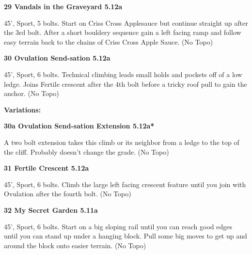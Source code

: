 \begin{multicols}{2}
\needspace{1.5cm}
\label{rt:Vandals in the Graveyard}
\colorbox{Goldenrod!20}{
\parbox{0.95\linewidth}{
\textbf{
29 Vandals in the Graveyard 5.12a  
}}}
\begin{adjustwidth}{0.5cm}{}			
45', Sport, 5 bolts. Start on Criss Cross Applesauce but continue straight up after the 3rd bolt. After a short bouldery sequence gain a left facing ramp and follow easy terrain back to the chains of Criss Cross Apple Sauce.
  (No Topo)
\end{adjustwidth}




\needspace{1.5cm}
\label{rt:Ovulation Send-sation}
\colorbox{Goldenrod!20}{
\parbox{0.95\linewidth}{
\textbf{
30 Ovulation Send-sation 5.12a  
}}}
\begin{adjustwidth}{0.5cm}{}			
45', Sport, 6 bolts. Technical climbing leads small holds and pockets off of a low ledge. Joins Fertile crescent after the 4th bolt before a tricky roof pull to gain the anchor.
  (No Topo)
\end{adjustwidth}


\begin{adjustwidth}{0.5cm}{}				
\needspace{3cm}
\textbf{Variations:} \newline

\needspace{1.5cm}
\label{vr:Ovulation Send-sation Extension}
\colorbox{Goldenrod!20}{
\parbox{0.95\linewidth}{
\textbf{
30a Ovulation Send-sation Extension 5.12a*  
}}}
\begin{adjustwidth}{0.5cm}{}			
A two bolt extension takes this climb or its neighbor from a ledge to the top of the cliff. Probably doesn't change the grade.
  (No Topo)
\end{adjustwidth}



\end{adjustwidth}


\needspace{1.5cm}
\label{rt:Fertile Crescent}
\colorbox{Goldenrod!20}{
\parbox{0.95\linewidth}{
\textbf{
31 Fertile Crescent 5.12a  
}}}
\begin{adjustwidth}{0.5cm}{}			
45', Sport, 6 bolts. Climb the large left facing crescent feature until you join with Ovulation after the fourth bolt.
  (No Topo)
\end{adjustwidth}




\needspace{1.5cm}
\label{rt:My Secret Garden}
\colorbox{RoyalBlue!20}{
\parbox{0.95\linewidth}{
\textbf{
32 My Secret Garden 5.11a  
}}}
\begin{adjustwidth}{0.5cm}{}			
45', Sport, 6 bolts. Start on a big sloping rail until you can reach good edges until you can stand up under a hanging block. Pull some big moves to get up and around the block onto easier terrain.
  (No Topo)
\end{adjustwidth}





\end{multicols}
